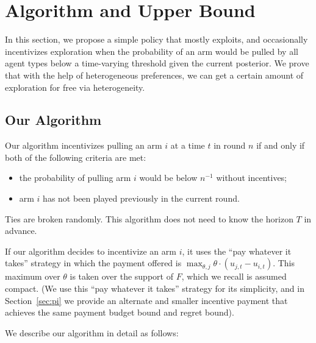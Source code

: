 
\section{Algorithm and Upper Bound}
\label{sec:ub}

In this section, we propose a simple policy that mostly exploits, and occasionally incentivizes exploration when the probability of an arm would be pulled by all agent types below a time-varying threshold given the current posterior. We prove that with the help of heterogeneous preferences, we can get a certain amount of exploration for free via heterogeneity. 

\subsection{Our Algorithm}
Our algorithm incentivizes pulling an arm $i$ at a time $t$ in round $n$ if and only if both of the following criteria are met:
\begin{itemize}
\item the probability of pulling arm $i$ would be below $n^{-1}$ without incentives; 
\item arm $i$ has not been played previously in the current round.
\end{itemize}
Ties are broken randomly.  This algorithm does not need to know the horizon $T$ in advance. 

If our algorithm decides to incentivize an arm $i$, it uses the ``pay whatever it takes'' strategy in which the payment offered is $\max_{\theta,j} \theta \cdot (u_{j,t} - u_{i,t})$. This maximum over $\theta$ is taken over the support of $F$, which we recall is assumed compact.  (We use this ``pay whatever it takes'' strategy for its simplicity, and in Section~\ref{sec:pi} we provide an alternate and smaller incentive payment that achieves the same payment budget bound and regret bound). 

We describe our algorithm in detail as follows:


